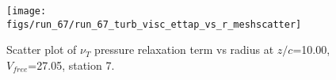 \begin{figure}[H]
\centering
\texttt{[image: figs/run\_67/run\_67\_turb\_visc\_ettap\_vs\_r\_meshscatter]}
\caption{Scatter plot of $\nu_T$ pressure relaxation term vs radius at $z/c$=10.00, $V_{free}$=27.05, station 7.}
\label{fig:run_67_turb_visc_ettap_vs_r_meshscatter}
\end{figure}


